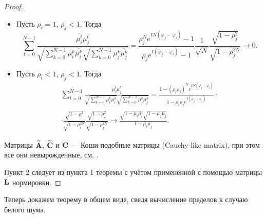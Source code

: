 \documentclass[12pt,a4paper]{article}
\begin{document}
\begin{proof}
\begin{itemize}
			\item Пусть $\rho_i = 1$, $\rho_j < 1$. Тогда
			\begin{equation*}
			\sum_{t=0}^{N-1} \frac{\overline{\mu_i^t} \mu_j^t}{\sqrt{\sum_{k=0}^{N-1} \mu_i^k \overline{\mu_i^k}} \sqrt{\sum_{k=0}^{N-1} \mu_j^k \overline{\mu_j^k}}} = \frac{\rho_j^N e^{I N (\varphi_j -\varphi_i)} - 1}{\rho_j e^{I (\varphi_j - \varphi_i)} - 1}  \frac{1}{\sqrt{N}} \frac{\sqrt{1 - \rho_j^2}}{\sqrt{1 - \rho_j^{2N}}} \to 0.
			\end{equation*}
			
			\item Пусть $\rho_i < 1$, $\rho_j < 1$. Тогда
			\begin{multline*}
			\sum_{t=0}^{N-1} \frac{\overline{\mu_i^t} \mu_j^t}{\sqrt{\sum_{k=0}^{N-1} \mu_i^k \overline{\mu_i^k}} \sqrt{\sum_{k=0}^{N-1} \mu_j^k \overline{\mu_j^k}}} = \frac{1 - (\rho_i \rho_j)^N e^{I N (\varphi_j -\varphi_i)}}{1 - \rho_i \rho_j e^{I (\varphi_j - \varphi_i)}} \cdot \\ \cdot \frac{\sqrt{1 - \rho_i^2}}{\sqrt{1 - \rho_i^{2N}}} \frac{\sqrt{1 - \rho_j^2}}{\sqrt{1 - \rho_j^{2N}}} \to \frac{\sqrt{1 - \mu_{i} \overline{\mu_{i}}}\sqrt{1 - \mu_{j} \overline{\mu_{j}}}}{1 - \overline{\mu_{i}} \mu_{j}}.
			\end{multline*}
				
		\end{itemize}
		
		Матрицы $\widetilde {\mathbf{A}}$, $\widetilde {\mathbf{C}}$ и $\mathbf{C}$ --- Коши-подобные матрицы (Cauchy-like matrix), при этом все они невырожденные, см. \cite{Schechter1959}.
		
		Пункт 2 следует из пункта 1 теоремы с учётом применённой с помощью матрицы $\mathbf{L}$ нормировки.
	\end{proof}

Теперь докажем теорему в общем виде, сведя вычисление пределов к случаю белого шума.
\end{document}
